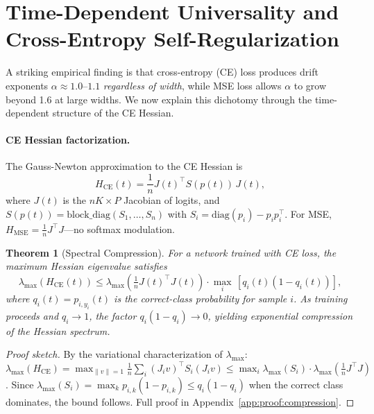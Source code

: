 \documentclass[11pt]{article}
\newcommand{\drexp}{\alpha}               %
\newcommand{\nsamples}{n}                 %
\newcommand{\nclasses}{K}                 %
\newtheorem{theorem}{Theorem}
\theoremstyle{definition}
\theoremstyle{remark}
\begin{document}
\section{Time-Dependent Universality and Cross-Entropy Self-Regularization}
\label{sec:timedep}

A striking empirical finding is that cross-entropy (CE) loss produces drift exponents $\drexp \approx 1.0$--$1.1$ \emph{regardless of width}, while MSE loss allows $\drexp$ to grow beyond 1.6 at large widths. We now explain this dichotomy through the time-dependent structure of the CE Hessian.

\paragraph{CE Hessian factorization.}
The Gauss-Newton approximation to the CE Hessian is
\begin{equation}\label{eq:ce_hessian}
    H_{\text{CE}}(t) = \frac{1}{\nsamples} J(t)^\top S(p(t))\, J(t),
\end{equation}
where $J(t)$ is the $\nsamples\nclasses \times P$ Jacobian of logits, and $S(p(t)) = \text{block\_diag}(S_1, \ldots, S_\nsamples)$ with $S_i = \text{diag}(p_i) - p_i p_i^\top$. For MSE, $H_{\text{MSE}} = \frac{1}{\nsamples} J^\top J$---no softmax modulation.

\begin{theorem}[Spectral Compression]\label{thm:compression}
For a network trained with CE loss, the maximum Hessian eigenvalue satisfies
\begin{equation}\label{eq:compression}
    \lambda_{\max}(H_{\text{CE}}(t)) \leq \lambda_{\max}\!\left(\tfrac{1}{\nsamples}J(t)^\top J(t)\right) \cdot \max_i\, [q_i(t)(1 - q_i(t))],
\end{equation}
where $q_i(t) = p_{i,y_i}(t)$ is the correct-class probability for sample $i$. As training proceeds and $q_i \to 1$, the factor $q_i(1-q_i) \to 0$, yielding exponential compression of the Hessian spectrum.
\end{theorem}

\begin{proof}[Proof sketch]
By the variational characterization of $\lambda_{\max}$:
$\lambda_{\max}(H_{\text{CE}}) = \max_{\|v\|=1} \frac{1}{\nsamples}\sum_i (J_i v)^\top S_i (J_i v) \leq \max_i \lambda_{\max}(S_i) \cdot \lambda_{\max}(\frac{1}{\nsamples}J^\top J)$.
Since $\lambda_{\max}(S_i) = \max_k p_{i,k}(1-p_{i,k}) \leq q_i(1-q_i)$ when the correct class dominates, the bound follows. Full proof in Appendix~\ref{app:proof:compression}.
\end{proof}
\end{document}
